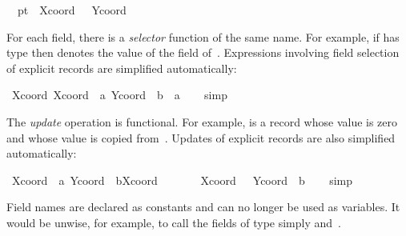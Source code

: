 \begin{isabellebody}
\ \ {\isachardoublequote}pt{}\ {\isasymequiv}\ {\isasymlparr}Xcoord\ {\isacharequal}\ {\isacharminus}{}{}{\isacharcomma}\ Ycoord\ {\isacharequal}\ {}{}{\isasymrparr}{\isachardoublequote}\isamarkupfalse%
%
\begin{isamarkuptext}%
For each field, there is a \emph{selector}
  function of the same name.  For example, if  has type  then  denotes the value of the  field of~.  Expressions involving field selection
  of explicit records are simplified automatically:%
\end{isamarkuptext}%
\isamarkuptrue%
\ {\isachardoublequote}Xcoord\ {\isasymlparr}Xcoord\ {\isacharequal}\ a{\isacharcomma}\ Ycoord\ {\isacharequal}\ b{\isasymrparr}\ {\isacharequal}\ a{\isachardoublequote}\isanewline
\ \ \isamarkupfalse%
\ simp\isamarkupfalse%
%
\begin{isamarkuptext}%
The \emph{update} operation is functional.  For
  example,  is a record whose 
  value is zero and whose  value is copied from~.  Updates of explicit records are also simplified automatically:%
\end{isamarkuptext}%
\isamarkuptrue%
\ {\isachardoublequote}{\isasymlparr}Xcoord\ {\isacharequal}\ a{\isacharcomma}\ Ycoord\ {\isacharequal}\ b{\isasymrparr}{\isasymlparr}Xcoord\ {\isacharcolon}{\isacharequal}\ {}{\isasymrparr}\ {\isacharequal}\isanewline
\ \ \ \ {\isasymlparr}Xcoord\ {\isacharequal}\ {}{\isacharcomma}\ Ycoord\ {\isacharequal}\ b{\isasymrparr}{\isachardoublequote}\isanewline
\ \ \isamarkupfalse%
\ simp\isamarkupfalse%
%
\begin{isamarkuptext}%
\begin{warn}
  Field names are declared as constants and can no longer be used as
  variables.  It would be unwise, for example, to call the fields of
  type  simply  and~.
  \end{warn}%
\end{isamarkuptext}%
\isamarkuptrue%
%
\isamarkuptrue%
%
\begin{isamarkuptext}%
%


\end{isamarkuptext}
\end{isabellebody}
